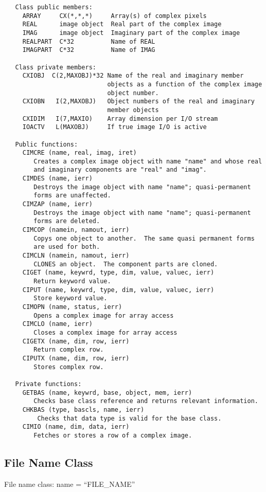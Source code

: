 {\small\begin{verbatim}
   Class public members:
     ARRAY     CX(*,*,*)     Array(s) of complex pixels
     REAL      image object  Real part of the complex image
     IMAG      image object  Imaginary part of the complex image
     REALPART  C*32          Name of REAL
     IMAGPART  C*32          Name of IMAG

   Class private members:
     CXIOBJ  C(2,MAXOBJ)*32 Name of the real and imaginary member
                            objects as a function of the complex image
                            object number.
     CXIOBN   I(2,MAXOBJ)   Object numbers of the real and imaginary
                            member objects
     CXIDIM   I(7,MAXIO)    Array dimension per I/O stream
     IOACTV   L(MAXOBJ)     If true image I/O is active

   Public functions:
     CIMCRE (name, real, imag, iret)
        Creates a complex image object with name "name" and whose real
        and imaginary components are "real" and "imag".
     CIMDES (name, ierr)
        Destroys the image object with name "name"; quasi-permanent
        forms are unaffected.
     CIMZAP (name, ierr)
        Destroys the image object with name "name"; quasi-permanent
        forms are deleted.
     CIMCOP (namein, namout, ierr)
        Copys one object to another.  The same quasi permanent forms
        are used for both.
     CIMCLN (namein, namout, ierr)
        CLONES an object.  The component parts are cloned.
     CIGET (name, keywrd, type, dim, value, valuec, ierr)
        Return keyword value.
     CIPUT (name, keywrd, type, dim, value, valuec, ierr)
        Store keyword value.
     CIMOPN (name, status, ierr)
        Opens a complex image for array access
     CIMCLO (name, ierr)
        Closes a complex image for array access
     CIGETX (name, dim, row, ierr)
        Return complex row.
     CIPUTX (name, dim, row, ierr)
        Stores complex row.

   Private functions:
     GETBAS (name, keywrd, base, object, mem, ierr)
        Checks base class reference and returns relevant information.
     CHKBAS (type, bascls, name, ierr)
         Checks that data type is valid for the base class.
     CIMIO (name, dim, data, ierr)
        Fetches or stores a row of a complex image.
\end{verbatim}}

\subsection{File Name Class}
   File name class: name = ``FILE\_NAME''

